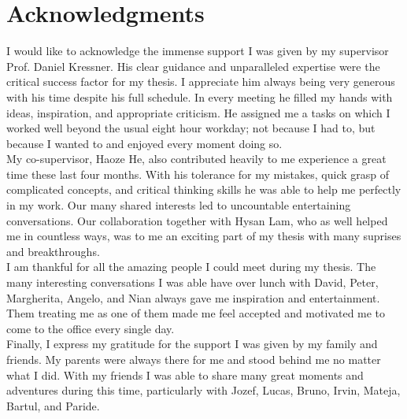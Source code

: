 \chapter*{Acknowledgments}
\label{chp:0-acknowledgments}

I would like to acknowledge the immense support I was given by my supervisor
Prof. Daniel Kressner. His clear guidance and unparalleled expertise were the
critical success factor for my thesis. I appreciate him always being very generous
with his time despite his full schedule. In every meeting he filled my hands with
ideas, inspiration, and appropriate criticism. He assigned me a tasks on which
I worked well beyond the usual eight hour workday; not because I had to, but because
I wanted to and enjoyed every moment doing so.\\ %

My co-supervisor, Haoze He, also contributed heavily to me experience a great time
these last four months. With his tolerance for my mistakes, quick grasp of
complicated concepts, and critical thinking skills he was able to help me
perfectly in my work. Our many shared interests led to uncountable
entertaining conversations. Our collaboration together with Hysan Lam, who
as well helped me in countless ways, was to me an exciting part of my thesis
with many suprises and breakthroughs.\\

I am thankful for all the amazing people I could meet during my thesis.
The many interesting conversations I was able have over lunch with David, Peter,
Margherita, Angelo, and Nian always gave me inspiration and entertainment.
Them treating me as one of them made me feel accepted and motivated me to come
to the office every single day.\\

Finally, I express my gratitude for the support I was given by my family and friends.
My parents were always there for me and stood behind me no matter what I did.
With my friends I was able to share many great moments and adventures during
this time, particularly with Jozef, Lucas, Bruno, Irvin, Mateja, Bartul,
and Paride.
